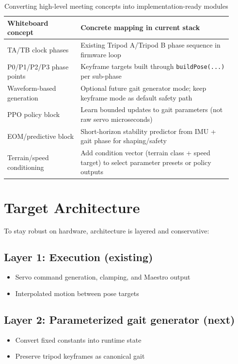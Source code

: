 \documentclass[11pt]{article}
\begin{document}
\begin{table}[h]
\centering
\begin{tabular}{>{\raggedright\arraybackslash}p{0.30\linewidth} >{\raggedright\arraybackslash}p{0.62\linewidth}}
\toprule
\textbf{Whiteboard concept} & \textbf{Concrete mapping in current stack} \\
\midrule
TA/TB clock phases & Existing Tripod A/Tripod B phase sequence in firmware loop \\
P0/P1/P2/P3 phase points & Keyframe targets built through \texttt{buildPose(...)} per sub-phase \\
Waveform-based generation & Optional future gait generator mode; keep keyframe mode as default safety path \\
PPO policy block & Learn bounded updates to gait parameters (not raw servo microseconds) \\
EOM/predictive block & Short-horizon stability predictor from IMU + gait phase for shaping/safety \\
Terrain/speed conditioning & Add condition vector (terrain class + speed target) to select parameter presets or policy outputs \\
\bottomrule
\end{tabular}
\caption{Converting high-level meeting concepts into implementation-ready modules}
\end{table}

\section{Target Architecture}

To stay robust on hardware, architecture is layered and conservative:

\subsection*{Layer 1: Execution (existing)}
\begin{itemize}
    \item Servo command generation, clamping, and Maestro output
    \item Interpolated motion between pose targets
\end{itemize}

\subsection*{Layer 2: Parameterized gait generator (next)}
\begin{itemize}
    \item Convert fixed constants into runtime state
    \item Preserve tripod keyframes as canonical gait
\end{itemize}
\end{document}
